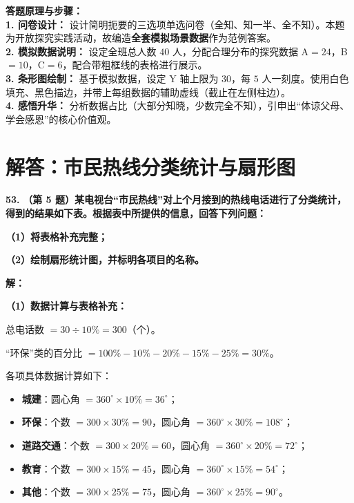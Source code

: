 \vspace{0.4cm}
{\small\color{blue!70!black}
\textbf{答题原理与步骤：}\\
\textbf{1. 问卷设计：} 设计简明扼要的三选项单选问卷（全知、知一半、全不知）。本题为开放探究实践活动，故编造\textbf{全套模拟场景数据}作为范例答案。\\
\textbf{2. 模拟数据说明：} 设定全班总人数 $40$ 人，分配合理分布的探究数据 A$=24$，B$=10$，C$=6$，配合带粗框线的表格进行展示。\\
\textbf{3. 条形图绘制：} 基于模拟数据，设定 Y 轴上限为 $30$，每 $5$ 人一刻度。使用白色填充、黑色描边，并带上每组数据的辅助虚线（截止在左侧柱边）。\\
\textbf{4. 感悟升华：} 分析数据占比（大部分知晓，少数完全不知），引申出“体谅父母、学会感恩”的核心价值观。
}

\newpage



\section{解答：市民热线分类统计与扇形图}

\vspace{0.6cm}

\textbf{\LARGE 53.} \textbf{（第 5 题）某电视台“市民热线”对上个月接到的热线电话进行了分类统计，得到的结果如下表。根据表中所提供的信息，回答下列问题：}

\textbf{（1）将表格补充完整；}

\textbf{（2）绘制扇形统计图，并标明各项目的名称。}

\vspace{0.4cm}
\textbf{解：}

\textbf{（1）数据计算与表格补充：}

总电话数 $= 30 \div 10\% = 300$（个）。

“环保”类的百分比 $= 100\% - 10\% - 20\% - 15\% - 25\% = 30\%$。

各项具体数据计算如下：
\begin{itemize}
    \item \textbf{城建}：圆心角 $= 360^\circ \times 10\% = 36^\circ$；
    \item \textbf{环保}：个数 $= 300 \times 30\% = 90$，圆心角 $= 360^\circ \times 30\% = 108^\circ$；
    \item \textbf{道路交通}：个数 $= 300 \times 20\% = 60$，圆心角 $= 360^\circ \times 20\% = 72^\circ$；
    \item \textbf{教育}：个数 $= 300 \times 15\% = 45$，圆心角 $= 360^\circ \times 15\% = 54^\circ$；
    \item \textbf{其他}：个数 $= 300 \times 25\% = 75$，圆心角 $= 360^\circ \times 25\% = 90^\circ$。
\end{itemize}

